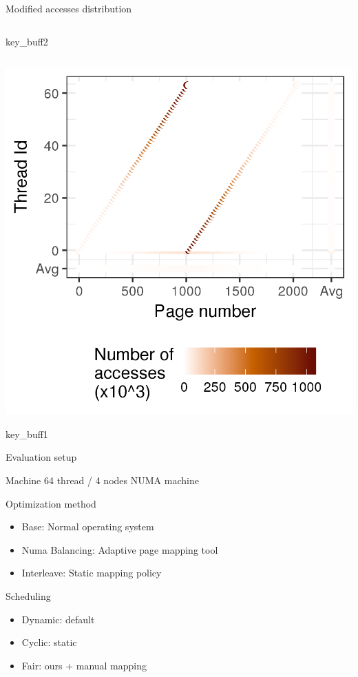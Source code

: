 \documentclass[xcolor={usenames,dvipsnames},hyperref={pdfusetitle}]{beamer}
\begin{document}
\begin{frame}{Modified accesses distribution}
{\begin{columns}
\begin{column}{.45\linewidth}
                \begin{block}{}
                    \centering
                    key\_buff2
                \end{block}
            \end{column}
        \end{columns}
    }{
        \centering
        \includegraphics[width=.6\linewidth]{tabarnac/is_b_kb1_dist_m.png}
        \begin{block}{}
            \centering
            key\_buff1
        \end{block}
    }
    \pause
\end{frame}

\begin{frame}{Evaluation setup}
    \begin{block}{Machine}
        64 thread / 4 nodes NUMA machine
    \end{block}
    \pause
    \begin{block}{Optimization method}
        \begin{itemize}
            \item Base: Normal operating system
            \item Numa Balancing: Adaptive page mapping tool
            \item Interleave: Static mapping policy
        \end{itemize}
    \end{block}
    \pause
    \begin{exampleblock}{Scheduling}
        \begin{itemize}
            \item Dynamic: default
            \item Cyclic: static
            \item Fair: ours + manual mapping
        \end{itemize}
    \end{exampleblock}
\end{frame}
\end{document}
